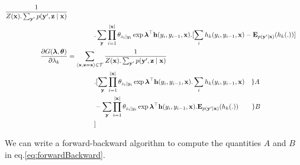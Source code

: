 \documentclass[11pt,onecolumn]{article}
\begin{document}
\begin{align}
    \frac
      {1}
      {Z(\mathbf{x}).\sum_\mathbf{y'}p(\mathbf{y'},\mathbf{z}\mid\mathbf{x})} \nonumber \\
    &\qquad\qquad . \sum_{\mathbf{y}}
                    \prod_{i=1}^{|\mathbf{x}|} \theta_{z_i\mid y_i} \exp \boldsymbol{\lambda}^\top \mathbf{h}(y_i, y_{i-1}, \mathbf{x})
                    . [  \sum_{i} h_k(y_i, y_{i-1}, \mathbf{x}) 
                      - \mathbf{E}_{p(\mathbf{y'}\mid\mathbf{x})}(h_k(.)) ] \\
\frac{\partial G(\boldsymbol{\lambda}, \boldsymbol{\theta})}{\partial \lambda_k} &=
  \sum_{\langle\mathbf{x},\mathbf{z}=\mathbf{x}\rangle \in \cal{T}} 
    \frac
      {1}
      {Z(\mathbf{x}).\sum_\mathbf{y'}p(\mathbf{y'},\mathbf{z}\mid\mathbf{x})} \nonumber \\
    &\qquad\qquad . [ \sum_{\mathbf{y}} 
                        \prod_{i=1}^{|\mathbf{x}|} \theta_{z_i\mid y_i} \exp \boldsymbol{\lambda}^\top \mathbf{h}(y_i, y_{i-1}, \mathbf{x})
                        . \sum_{i} h_k(y_i, y_{i-1}, \mathbf{x}) \quad \} A \nonumber \\
    &\qquad\qquad   - \sum_{\mathbf{y}}
                        \prod_{i=1}^{|\mathbf{x}|} \theta_{z_i\mid y_i} \exp \boldsymbol{\lambda}^\top \mathbf{h}(y_i, y_{i-1}, \mathbf{x})
                        . \mathbf{E}_{p(\mathbf{y'}\mid\mathbf{x})}(h_k(.)) \qquad \} B \nonumber \\
    &\qquad\qquad   ] \label{eq:forwardBackward} 
\end{align}

We can write a forward-backward algorithm to compute the quantities $A$ and $B$ in eq.\ref{eq:forwardBackward}.
\end{document}
